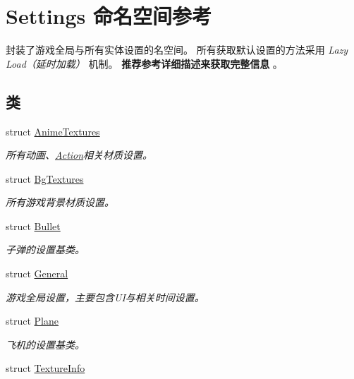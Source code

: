 \hypertarget{namespace_settings}{}\section{Settings 命名空间参考}
\label{namespace_settings}


封装了游戏全局与所有实体设置的名空间。 所有获取默认设置的方法采用 {\itshape Lazy Load（延时加载）} 机制。 {\bfseries 推荐参考详细描述来获取完整信息} 。  


\subsection*{类}
\begin{DoxyCompactItemize}
\item 
struct \hyperlink{struct_settings_1_1_anime_textures}{Anime\+Textures}
\begin{DoxyCompactList}\small\item\em 所有动画、\hyperlink{class_action}{Action}相关材质设置。 \end{DoxyCompactList}\item 
struct \hyperlink{struct_settings_1_1_bg_textures}{Bg\+Textures}
\begin{DoxyCompactList}\small\item\em 所有游戏背景材质设置。 \end{DoxyCompactList}\item 
struct \hyperlink{struct_settings_1_1_bullet}{Bullet}
\begin{DoxyCompactList}\small\item\em 子弹的设置基类。 \end{DoxyCompactList}\item 
struct \hyperlink{struct_settings_1_1_general}{General}
\begin{DoxyCompactList}\small\item\em 游戏全局设置，主要包含\+U\+I与相关时间设置。 \end{DoxyCompactList}\item 
struct \hyperlink{struct_settings_1_1_plane}{Plane}
\begin{DoxyCompactList}\small\item\em 飞机的设置基类。 \end{DoxyCompactList}\item 
struct \hyperlink{struct_settings_1_1_texture_info}{Texture\+Info}
\end{DoxyCompactItemize}
